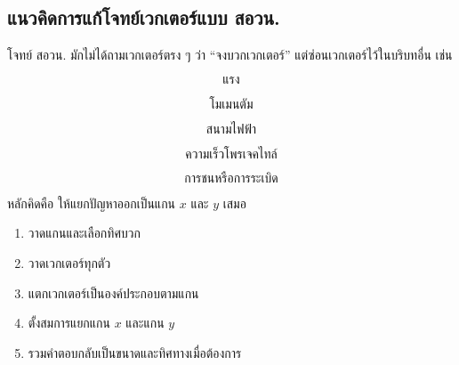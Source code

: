 \documentclass[12pt,a4paper]{report}
\begin{document}
\subsection{แนวคิดการแก้โจทย์เวกเตอร์แบบ สอวน.}

โจทย์ สอวน. มักไม่ได้ถามเวกเตอร์ตรง ๆ ว่า ``จงบวกเวกเตอร์'' แต่ซ่อนเวกเตอร์ไว้ในบริบทอื่น เช่น

\[
\text{แรง}
\]

\[
\text{โมเมนตัม}
\]

\[
\text{สนามไฟฟ้า}
\]

\[
\text{ความเร็วโพรเจคไทล์}
\]

\[
\text{การชนหรือการระเบิด}
\]

หลักคิดคือ ให้แยกปัญหาออกเป็นแกน $x$ และ $y$ เสมอ

\begin{tcolorbox}[title=ขั้นตอนแก้โจทย์เวกเตอร์]
\begin{enumerate}
    \item วาดแกนและเลือกทิศบวก
    \item วาดเวกเตอร์ทุกตัว
    \item แตกเวกเตอร์เป็นองค์ประกอบตามแกน
    \item ตั้งสมการแยกแกน $x$ และแกน $y$
    \item รวมคำตอบกลับเป็นขนาดและทิศทางเมื่อต้องการ
\end{enumerate}
\end{tcolorbox}
\end{document}
